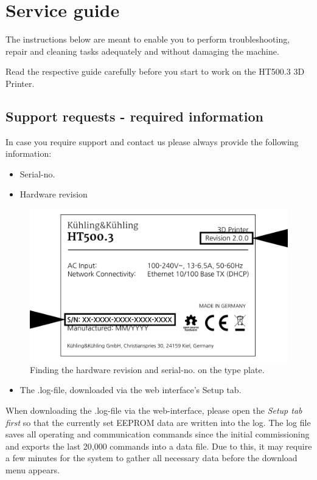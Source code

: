 \section{Service guide}

The instructions below are meant to enable you to perform troubleshooting, repair and cleaning tasks adequately and without damaging the machine.

Read the respective guide carefully before you start to work on the HT500.3 3D Printer.


\subsection{Support requests - required information}

 In case you require support and contact us please always provide the following information:

\begin{itemize}
  \item Serial-no.
  \item Hardware revision
\end{itemize}

\begin{figure}[H]
  \centering
  \includegraphics[width=.7\linewidth]{./img/type_plate_ht500-3.png}
  \caption{Finding the hardware revision and serial-no. on the type plate.}
\end{figure}

\begin{itemize}
  \item The .log-file, downloaded via the web interface's Setup tab.
\end{itemize}

\begin{info}
  When downloading the .log-file via the web-interface, please open the \emph{Setup tab first} so that the currently set EEPROM data are written into the log.
  The log file saves all operating and communication commands since the initial commissioning and exports the last 20,000 commands into a data file. Due to this, it may require a few minutes for the system to gather all necessary data before the download menu appears. 
\end{info}

